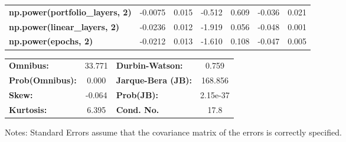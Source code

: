 \begin{center}
\begin{tabular}{lcccccc}
\textbf{np.power(portfolio\_layers, 2)}    &      -0.0075  &        0.015     &    -0.512  &         0.609        &       -0.036    &        0.021     \\
\textbf{np.power(linear\_layers, 2)}       &      -0.0236  &        0.012     &    -1.919  &         0.056        &       -0.048    &        0.001     \\
\textbf{np.power(epochs, 2)}               &      -0.0212  &        0.013     &    -1.610  &         0.108        &       -0.047    &        0.005     \\
\bottomrule
\end{tabular}
\begin{tabular}{lclc}
\textbf{Omnibus:}       & 33.771 & \textbf{  Durbin-Watson:     } &    0.759  \\
\textbf{Prob(Omnibus):} &  0.000 & \textbf{  Jarque-Bera (JB):  } &  168.856  \\
\textbf{Skew:}          & -0.064 & \textbf{  Prob(JB):          } & 2.15e-37  \\
\textbf{Kurtosis:}      &  6.395 & \textbf{  Cond. No.          } &     17.8  \\
\bottomrule
\end{tabular}
\end{center}

Notes: \newline
 [1] Standard Errors assume that the covariance matrix of the errors is correctly specified.